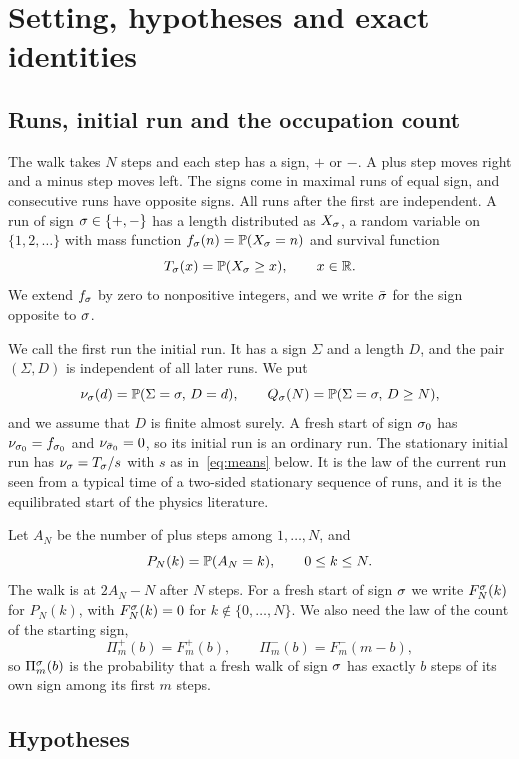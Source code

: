 \section{Setting, hypotheses and exact identities}\label{sec:setting}

\subsection{Runs, initial run and the occupation count}\label{sec:runs}

The walk takes $N$ steps and each step has a sign, $\plus$ or $\minus$. A plus
step moves right and a minus step moves left. The signs come in maximal runs of equal sign,
and consecutive runs have opposite signs. All runs after the first are
independent. A run of sign $\sigma\in\{{+},{-}\}$ has a length distributed as
$X_\sigma$, a random variable on $\{1,2,\dots\}$ with mass function
$f_\sigma(n)=\mathbb{P}(X_\sigma=n)$ and survival function
\[
 T_\sigma(x)=\mathbb{P}(X_\sigma\ge x),\qquad x\in\mathbb{R} .
\]
We extend $f_\sigma$ by zero to nonpositive integers, and we write $\bar\sigma$ for the
sign opposite to $\sigma$.

We call the first run the initial run. It has a sign $\Sigma$ and a length $D$, and
the pair $(\Sigma,D)$ is independent of all later runs. We put
\[
 \nu_\sigma(d)=\mathbb{P}(\Sigma=\sigma,\,D=d),\qquad
 Q_\sigma(N)=\mathbb{P}(\Sigma=\sigma,\,D\ge N),
\]
and we assume that $D$ is finite almost surely. A fresh start of sign $\sigma_0$
has $\nu_{\sigma_0}=f_{\sigma_0}$ and $\nu_{\bar\sigma_0}=0$, so its initial run is an
ordinary run. The stationary initial run has $\nu_\sigma=T_\sigma/s$ with $s$ as
in~\eqref{eq:means} below. It is the law of the current run seen from a typical
time of a two-sided stationary sequence of runs, and it is the equilibrated start
of the physics literature.

Let $A_N$ be the number of plus steps among $1,\dots,N$, and
\[
 P_N(k)=\mathbb{P}(A_N=k),\qquad 0\le k\le N .
\]
The walk is at $2A_N-N$ after $N$ steps. For a fresh start of sign $\sigma$ we
write $F^\sigma_N(k)$ for $P_N(k)$, with $F^\sigma_N(k)=0$ for $k\notin\{0,\dots,N\}$.
We also need the law of the count of the starting sign,
\[
 \Pi^\plus_m(b)=F^\plus_m(b),\qquad \Pi^\minus_m(b)=F^\minus_m(m-b),
\]
so $\Pi^\sigma_m(b)$ is the probability that a fresh walk of sign $\sigma$ has
exactly $b$ steps of its own sign among its first $m$ steps.

\subsection{Hypotheses}\label{sec:hypotheses}


